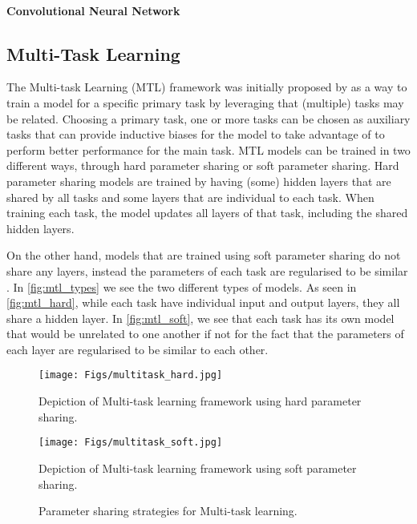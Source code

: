\paragraph{Convolutional Neural Network}


\subsection{Multi-Task Learning}
The Multi-task Learning (MTL) framework was initially proposed by \citet{Caruana:1993} as a way to train a model for a specific primary task by leveraging that (multiple) tasks may be related. 
Choosing a primary task, one or more tasks can be chosen as auxiliary tasks that can provide inductive biases for the model to take advantage of to perform better performance for the main task.
MTL models can be trained in two different ways, through hard parameter sharing or soft parameter sharing.
Hard parameter sharing models are trained by having (some) hidden layers that are shared by all tasks and some layers that are individual to each task.
When training each task, the model updates all layers of that task, including the shared hidden layers.

On the other hand, models that are trained using soft parameter sharing do not share any layers, instead the parameters of each task are regularised to be similar \citep{Duong:2015}.
In \autoref{fig:mtl_types} we see the two different types of models.
As seen in \autoref{fig:mtl_hard}, while each task have individual input and output layers, they all share a hidden layer.
In \autoref{fig:mtl_soft}, we see that each task has its own model that would be unrelated to one another if not for the fact that the parameters of each layer are regularised to be similar to each other.

\begin{figure}
 \centering
 \begin{minipage}{0.5\linewidth}
   \centering
   \texttt{[image: Figs/multitask\_hard.jpg]}
   \caption{Depiction of Multi-task learning framework using hard parameter sharing.}
   \label{fig:mtl_hard}
 \end{minipage}
 \begin{minipage}{0.5\linewidth}
   \centering
    \texttt{[image: Figs/multitask\_soft.jpg]}
   \caption{Depiction of Multi-task learning framework using soft parameter sharing.}
   \label{fig:mtl_soft}
 \end{minipage}
 \caption{Parameter sharing strategies for Multi-task learning.}
 \label{fig:mtl_types}
\end{figure}

